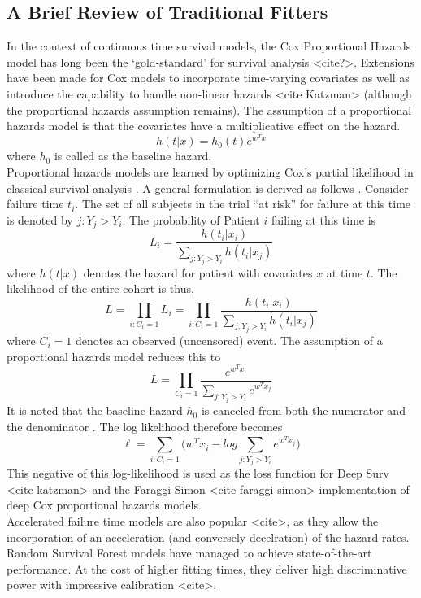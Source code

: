 \documentclass[%
 reprint,
 amsmath,amssymb,
 aps,
]{revtex4-2}
\begin{document}
\subsection{\label{trad_fits}A Brief Review of Traditional Fitters}
In the context of continuous time survival models, the Cox Proportional Hazards model has long been the `gold-standard' for survival analysis <cite?>. Extensions have been made for Cox models to incorporate time-varying covariates as well as introduce the capability to handle non-linear hazards <cite Katzman> (although the proportional hazards assumption remains). The assumption of a proportional hazards model is that the covariates have a multiplicative effect on the hazard.
\[
h(t|x) = h_0(t)e^{w^Tx}
\]
where $h_0$ is called as the baseline hazard.\\

Proportional hazards models are learned by optimizing Cox’s partial likelihood in classical survival analysis \cite{raykar_cindex}. A general formulation is derived as follows \cite{Moore_2016}. Consider failure time $t_i$. The set of all subjects in the trial “at risk” for failure at this time is denoted by $j:Y_j>Y_i$. The probability of Patient $i$ failing at this time is 
\[
L_i = \frac{h(t_i | x_i)}{\sum^{}_{j:Y_j>Y_i}h(t_i|x_j)}
\]
where $h(t|x)$ denotes the hazard for patient with covariates $x$ at time $t$. The likelihood of the entire cohort is thus,
\[
L = \prod^{}_{i:C_i=1}L_i = \prod^{}_{i:C_i=1}\frac{h(t_i | x_i)}{\sum^{}_{j:Y_j>Y_i}h(t_i|x_j)}
\]
where $C_i=1$ denotes an observed (uncensored) event. The assumption of a proportional hazards model reduces this to
\[
L = \prod^{}_{C_i=1}\frac{e^{w^Tx_i}}{\sum^{}_{j:Y_j>Y_i}e^{w^Tx_j}}
\] 
It is noted that the baseline hazard $h_0$ is canceled from both the numerator and the denominator \cite{raykar_cindex}. The log likelihood therefore becomes
\[
\ell = \sum^{}_{i:C_i=1} \Bigg( w^Tx_i - log\sum^{}_{j:Y_j>Y_i}e^{w^Tx_j}\Bigg)
\]
This negative of this log-likelihood is used as the loss function for Deep Surv <cite katzman> and the Faraggi-Simon <cite faraggi-simon> implementation of deep Cox proportional hazards models.\\

Accelerated failure time models are also popular <cite>, as they allow the incorporation of an acceleration (and conversely decelration) of the hazard rates.\\

Random Survival Forest models have managed to achieve state-of-the-art performance. At the cost of higher fitting times, they deliver high discriminative power with impressive calibration <cite>.\\
\end{document}
